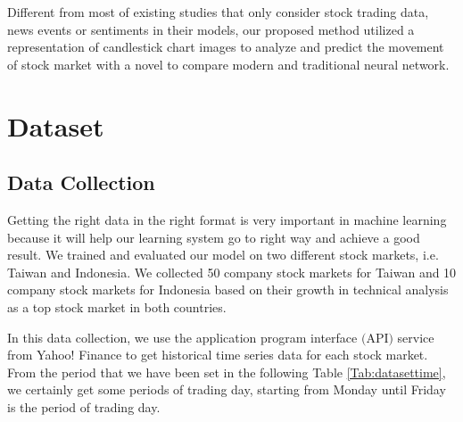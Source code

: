 \documentclass[12pt]{article}
\begin{document}
\par
Different from most of existing studies that only consider stock trading data, news events or sentiments in their models, our proposed method utilized a representation of candlestick chart images to analyze and predict the movement of stock market with a novel to compare modern and traditional neural network. 
\section{Dataset}
\subsection{Data Collection}
\begin{table}[]
\centering
\caption{The period time of our dataset, separated between the training, testing and independent data.}
\label{Tab:datasettime}
\end{table}
Getting the right data in the right format is very important in machine learning because it will help our learning system go to right way and achieve a good result. We trained and evaluated our model on two different stock markets, i.e. Taiwan and Indonesia. We collected 50 company stock markets for Taiwan and 10 company stock markets for Indonesia based on their growth in technical analysis as a top stock market in both countries.

In this data collection, we use the application program interface $($API$)$ service from Yahoo! Finance to get historical time series data for each stock market. From the period that we have been set in the following Table \ref{Tab:datasettime}, we certainly get some periods of trading day, starting from Monday until Friday is the period of trading day.
\end{document}
